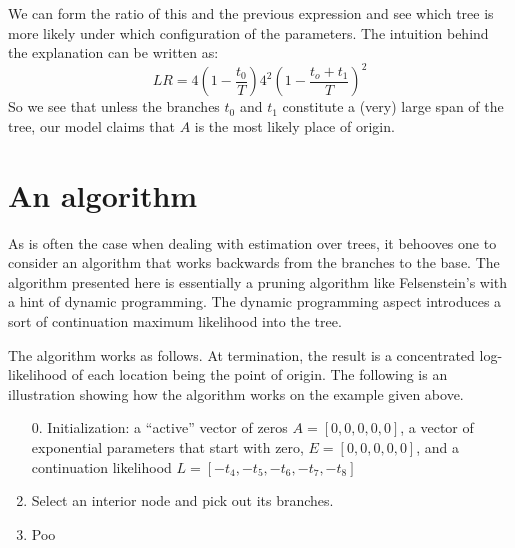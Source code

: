 \documentclass[11pt]{article}
\begin{document}
 We can form the ratio of this and the previous expression and see which tree is more likely under which configuration of the parameters. The intuition behind the explanation can be written as: 
 \begin{equation*}
 LR = 4\left({1-\frac{t_0}{T}}\right)4^2\left(1-\frac{t_o+t_1}{T}\right)^2
 \end{equation*}
So we see that unless the branches $t_0$ and $t_1$ constitute a (very) large span of the tree, our model claims that $A$ is the most likely place of origin. 

\section{An algorithm}

As is often the case when dealing with estimation over trees, it behooves one to consider an algorithm that works backwards from the branches to the base. The algorithm presented here is essentially a pruning algorithm like Felsenstein's with a hint of dynamic programming. The dynamic programming aspect introduces a sort of continuation maximum likelihood into the tree. 

The algorithm works as follows. At termination, the result is a concentrated log-likelihood of each location being the point of origin.  The following is an illustration showing how the algorithm works on the example given above. 

\begin{enumerate}
\item[0.] Initialization: a ``active'' vector of zeros $A=[0,0,0,0,0]$, a vector of exponential parameters that start with zero, $E=[0,0,0,0,0]$, and a continuation likelihood $L=[-t_4,-t_5,-t_6,-t_7,-t_8]$
\item  Select an interior node and pick out its branches. 
\item  Poo
\end{enumerate}
\end{document}
